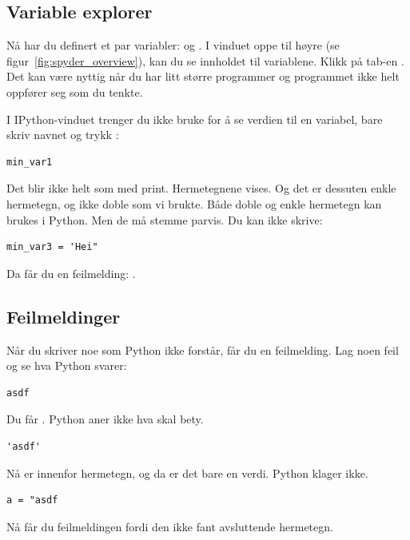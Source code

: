 \subsection{Variable explorer}

Nå har du definert et par variabler:  og . I vinduet oppe til høyre (se figur~\ref{fig:spyder_overview}), kan du se innholdet til variablene. Klikk på tab-en . Det kan være nyttig når du har litt større programmer og programmet ikke helt oppfører seg som du tenkte.

I IPython-vinduet trenger du ikke bruke  for å se verdien til en variabel, bare skriv navnet og trykk :
\begin{lstlisting}
min_var1
\end{lstlisting}

Det blir ikke helt som med print. Hermetegnene vises. Og det er dessuten enkle hermetegn, og ikke doble som vi brukte. Både doble og enkle hermetegn kan brukes i Python. Men de må stemme parvis. Du kan ikke skrive:

\begin{lstlisting}
min_var3 = 'Hei"
\end{lstlisting}

Da får du en feilmelding: .

\subsection{Feilmeldinger}

Når du skriver noe som Python ikke forstår, får du en feilmelding.  Lag noen feil og se hva Python svarer:
\begin{lstlisting}
asdf
\end{lstlisting}

Du får . Python aner ikke hva  skal bety.

\begin{lstlisting}
'asdf'
\end{lstlisting}

Nå er  innenfor hermetegn, og da er det bare en verdi. Python klager ikke.

\begin{lstlisting}
a = "asdf
\end{lstlisting}
Nå får du feilmeldingen  fordi den ikke fant avsluttende hermetegn.

